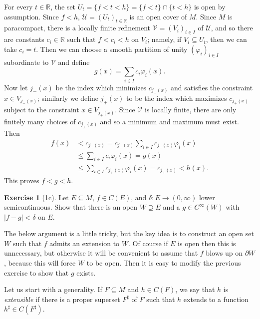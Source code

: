 \documentclass[10pt]{article}
\newcommand{\RR}{\mathbb{R}}
\theoremstyle{definition}
\newtheorem{exer}{Exercise}
\begin{document}
For every $t \in \RR$, the set $U_t = \{f < t < h\} = \{f < t\} \cap \{t < h\}$ is open by assumption.
Since $f < h$, $\mathcal U = (U_t)_{t \in \RR}$ is an open cover of $M$.
Since $M$ is paracompact, there is a locally finite refinement $\mathcal V = (V_i)_{i \in I}$ of $\mathcal U$, and so there are constants $c_i \in \RR$ such that $f < c_i < h$ on $V_i$; namely, if $V_i \subseteq U_t$, then we can take $c_i = t$.
Then we can choose a smooth partition of unity $(\varphi_i)_{i \in I}$ subordinate to $\mathcal V$ and define
$$g(x) = \sum_{i \in I} c_i \varphi_i(x).$$
Now let $j_-(x)$ be the index which minimizes $c_{j_-(x)}$ and satisfies the constraint $x \in V_{j_-(x)}$; similarly we define $j_+(x)$ to be the index which maximizes $c_{j_+(x)}$ subject to the constraint $x \in V_{j_+(x)}$.
Since $\mathcal V$ is locally finite, there are only finitely many choices of $c_{j_\pm(x)}$ and so a minimum and maximum must exist.
Then
\begin{align*}
f(x) &< c_{j_-(x)} = c_{j_-(x)} \sum_{i \in I} c_{j_-(x)} \varphi_i(x) \\
&\leq \sum_{i \in I} c_i \varphi_i(x) = g(x) \\
&\leq \sum_{i \in I} c_{j_+(x)} \varphi_i(x) = c_{j_+(x)} < h(x).
\end{align*}
This proves $f < g < h$.

\begin{exer}[1c]
Let $E \subseteq M$, $f \in C(E)$, and $\delta: E \to (0, \infty)$ lower semicontinuous.
Show that there is an open $W \supseteq E$ and a $g \in C^\infty(W)$ with $|f - g| < \delta$ on $E$.
\end{exer}

The below argument is a little tricky, but the key idea is to construct an open set $W$ such that $f$ admits an extension to $W$.
Of course if $E$ is open then this is unnecessary, but otherwise it will be convenient to assume that $f$ blows up on $\partial W$, because this will force $W$ to be open.
Then it is easy to modify the previous exercise to show that $g$ exists.

Let us start with a generality. If $F \subseteq M$ and $h \in C(F)$, we say that $h$ is \emph{extensible} if there is a proper superset $F^\sharp$ of $F$ such that $h$ extends to a function $h^\sharp \in C(F^\sharp)$.
\end{document}
